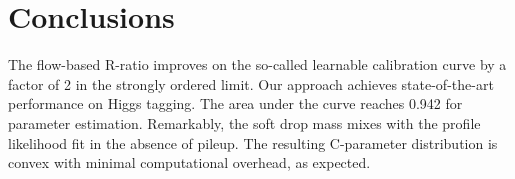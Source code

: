 \section{Conclusions}\label{sec:conclusions}

The flow-based R-ratio improves on the so-called learnable calibration
curve by a factor of 2 in the strongly ordered limit. Our approach
achieves state-of-the-art performance on Higgs tagging. The area under
the curve reaches 0.942 for parameter estimation. Remarkably, the soft
drop mass mixes with the profile likelihood fit in the absence of
pileup. The resulting C-parameter distribution is convex with minimal
computational overhead, as expected.

